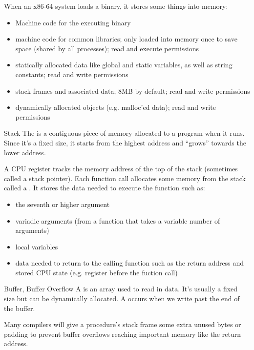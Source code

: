 \documentclass[code]{amznotes}
\begin{document}
When an x86-64 system loads a binary, it stores some things into memory:
\begin{itemize}
    \item {} Machine code for the executing binary
    \item {} machine code for common libraries; only loaded into memory once to save space (shared by all processes); read and execute permissions
    \item {} statically allocated data like global and static variables, as well as string constants; read and write permissions
    \item {} stack frames and associated data; 8MB by default; read and write permissions
    \item {} dynamically allocated objects (e.g. malloc'ed data); read and write permissions
\end{itemize}

\begin{dfnbox}{Stack}{}
    The  is a contiguous piece of memory allocated to a program when it runs. Since it's a fixed size, it starts from the highest address and ``grows'' towards the lower address.
\end{dfnbox}

A CPU register tracks the memory address of the top of the stack (sometimes called a stack pointer). Each function call allocates some memory from the stack called a . It stores the data needed to execute the function such as:
\begin{itemize}
    \item the seventh or higher argument
    \item variadic arguments (from a function that takes a variable number of arguments)
    \item local variables
    \item data needed to return to the calling function such as the return address and stored CPU state (e.g. register before the fuction call)
\end{itemize}

\begin{dfnbox}{Buffer, Buffer Overflow}{}
    A  is an array used to read in data. It's usually a fixed size but can be dynamically allocated. A  occurs when we write past the end of the buffer.
\end{dfnbox}

\begin{notebox}
    Many compilers will give a procedure's stack frame some extra unused bytes or padding to prevent buffer overflows reaching important memory like the return address.
\end{notebox}
\end{document}
